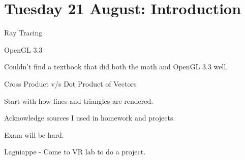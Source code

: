 \section{Tuesday 21 August:  Introduction}

Ray Tracing

OpenGL 3.3

\qquad Couldn't find a textbook that did both the math and OpenGL 3.3 well.  

Cross Product v/s Dot Product of Vectors

Start with how lines and triangles are rendered.  

Acknowledge sources I used in homework and projects.  

Exam will be hard.  

Lagniappe - Come to VR lab to do a project.  

\

